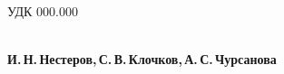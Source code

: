 \documentclass[14pt,a4paper,oneside]{article}
\begin{document}
\noindent УДК 000.000 
 
\begin{center}
    \textbf{\LARGE } \\[1em]
    \textbf{И.\,Н.\,Нестеров,\,С.\,В.\,Клочков,\,А.\,С.\,Чурсанова} \\[2em]
\end{center}





\end{document}
